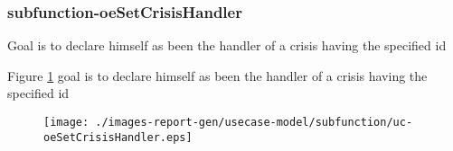 \subsubsection{subfunction-oeSetCrisisHandler}

\label{RE-use-case-oeSetCrisisHandler}


Goal is to declare himself as been the handler of a crisis having the specified id		  


\begin{usecase}
  









\end{usecase} 

Figure \ref{fig:lu.uni.lassy.excalibur.myproject-RE-UCD-uc-oeSetCrisisHandler}
goal is to declare himself as been the handler of a crisis having the specified id

\begin{figure}[htbp]
\begin{center}

\texttt{[image: ./images-report-gen/usecase-model/subfunction/uc-oeSetCrisisHandler.eps]}
\end{center}
\caption[lu.uni.lassy.excalibur.myproject Use Case Diagram: uc-oeSetCrisisHandler]{}
\label{fig:lu.uni.lassy.excalibur.myproject-RE-UCD-uc-oeSetCrisisHandler}
\end{figure}
\vspace{0.5cm}
